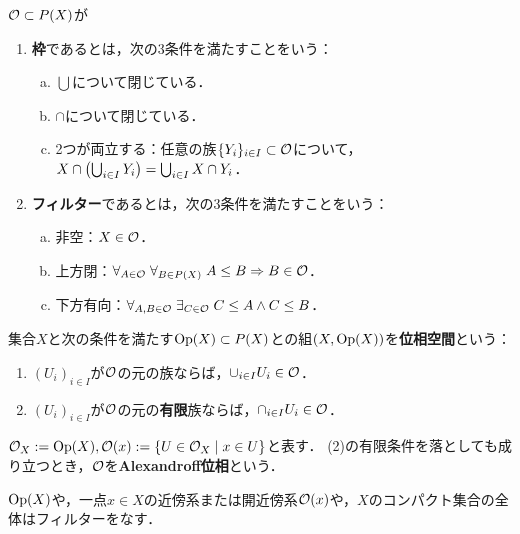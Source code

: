 \documentclass[uplatex,dvipdfmx]{jsreport}
\begin{document}
\begin{definition}
    $\mathcal{O}\subset P(X)$が
    \begin{enumerate}
        \item \textbf{枠}であるとは，次の3条件を満たすことをいう：
        \begin{enumerate}[(a)]
            \item $\bigcup$について閉じている．
            \item $\cap$について閉じている．
            \item 2つが両立する：任意の族$\{Y_i\}_{i\in I}\subset\mathcal{O}$について，$X\cap\left(\bigcup_{i\in I}Y_i\right)=\bigcup_{i\in I}X\cap Y_i$．
        \end{enumerate}
        \item \textbf{フィルター}であるとは，次の3条件を満たすことをいう：
        \begin{enumerate}[(a)]
            \item 非空：$X\in\mathcal{O}$．
            \item 上方閉：$\forall_{A\in\mathcal{O}}\;\forall_{B\in P(X)}\;A\le B\Rightarrow B\in\mathcal{O}$．
            \item 下方有向：$\forall_{A,B\in\mathcal{O}}\;\exists_{C\in\mathcal{O}}\;C\le A\land C\le B$．
        \end{enumerate}
    \end{enumerate}
\end{definition}

\begin{definition}
    集合$X$と次の条件を満たす$\mathrm{Op}(X)\subset P(X)$との組$(X,\mathrm{Op}(X))$を\textbf{位相空間}という：
    \begin{enumerate}
        \item $(U_i)_{i\in I}$が$\mathcal{O}$の元の族ならば，$\cup_{i\in I}U_i\in\mathcal{O}$．
        \item $(U_i)_{i\in I}$が$\mathcal{O}$の元の\textbf{有限}族ならば，$\cap_{i\in I}U_i\in\mathcal{O}$．
    \end{enumerate}
    $\mathcal{O}_X:=\mathrm{Op}(X),\mathcal{O}(x):=\left\{U\in\mathcal{O}_X\mid x\in U\right\}$と表す．
    (2)の有限条件を落としても成り立つとき，$\mathcal{O}$を\textbf{Alexandroff位相}という．
\end{definition}

\begin{example}[近傍フィルター]
    $\mathrm{Op}(X)$や，一点$x\in X$の近傍系または開近傍系$\mathcal{O}(x)$や，$X$のコンパクト集合の全体はフィルターをなす．
\end{example}
\end{document}
